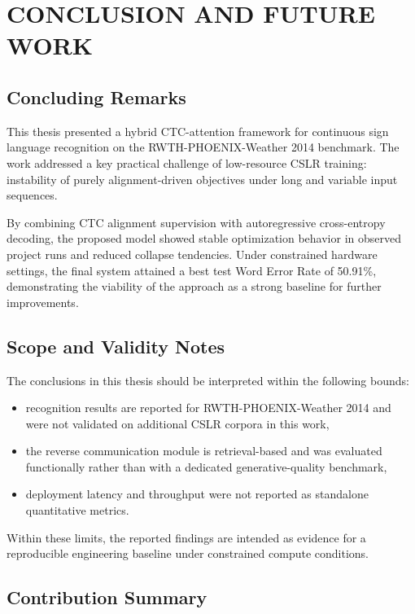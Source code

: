 \chapter{CONCLUSION AND FUTURE WORK}

\section{Concluding Remarks}

This thesis presented a hybrid CTC-attention framework for continuous sign language recognition on the RWTH-PHOENIX-Weather 2014 benchmark. The work addressed a key practical challenge of low-resource CSLR training: instability of purely alignment-driven objectives under long and variable input sequences.

By combining CTC alignment supervision with autoregressive cross-entropy decoding, the proposed model showed stable optimization behavior in observed project runs and reduced collapse tendencies. Under constrained hardware settings, the final system attained a best test Word Error Rate of 50.91\%, demonstrating the viability of the approach as a strong baseline for further improvements.

\section{Scope and Validity Notes}

The conclusions in this thesis should be interpreted within the following bounds:
\begin{itemize}
    \item recognition results are reported for RWTH-PHOENIX-Weather 2014 and were not validated on additional CSLR corpora in this work,
    \item the reverse communication module is retrieval-based and was evaluated functionally rather than with a dedicated generative-quality benchmark,
    \item deployment latency and throughput were not reported as standalone quantitative metrics.
\end{itemize}

Within these limits, the reported findings are intended as evidence for a reproducible engineering baseline under constrained compute conditions.

\section{Contribution Summary}

